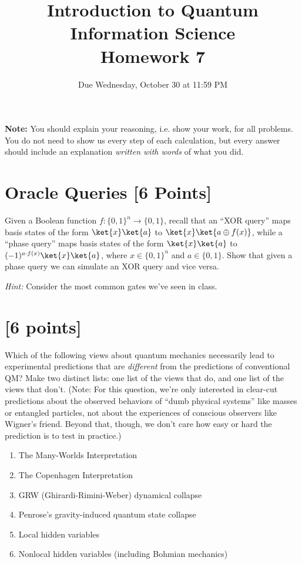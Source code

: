 \documentclass[11pt]{article}
\providecommand{\due}{Due Wednesday, October 30 at 11:59 PM}
\begin{document}
\title{Introduction to Quantum Information Science\\Homework 7}
\date{\due}

\maketitle

	\textbf{Note:} You should explain your reasoning, i.e. show your work, for all problems. You do not need to show us every step of each calculation, but every answer should include an explanation \emph{written with words} of what you did.
\section{Oracle Queries [6 Points]} Given a Boolean function $f: \{0,1\}^n \to \{0,1\}$, recall that an ``XOR query'' maps basis states of the form $\ket{x}\ket{a}$ to $\ket{x}\ket{a \oplus f(x)}$, while a ``phase query'' maps basis states of the form $\ket{x}\ket{a}$ to $(-1)^{a \cdot f(x)}\ket{x}\ket{a}$, where $x \in \{0,1\}^n$ and $a \in \{0,1\}$. Show that given a phase query we can simulate an XOR query and vice versa. 

\noindent \textit{Hint:} Consider the most common gates we've seen in class.



\section{[6 points]}
Which of the following views about quantum mechanics necessarily
lead to experimental predictions that are \emph{different} from the
predictions of conventional QM? 
Make two distinct lists: one list of the views that do, and one list of the views that don't.
(Note: For this question, we're only interested in clear-cut predictions about the observed behaviors of ``dumb physical systems'' like masses or entangled particles, not about the experiences of conscious observers like Wigner's friend.  Beyond that, though, we don't care how easy or hard the prediction is to test in practice.)
\begin{enumerate}[label=(\Alph*)]
	\item The Many-Worlds Interpretation
	
	\item The Copenhagen Interpretation
	
	\item GRW (Ghirardi-Rimini-Weber) dynamical collapse
	
	\item Penrose's gravity-induced quantum state collapse
	
	\item Local hidden variables
	
	\item Nonlocal hidden variables (including Bohmian mechanics)
\end{enumerate}
\end{document}
